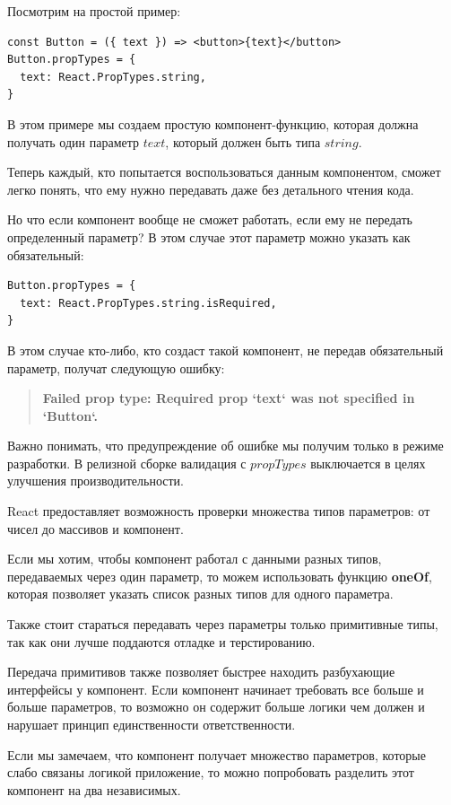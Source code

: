 Посмотрим на простой пример:

\begin{lstlisting}
const Button = ({ text }) => <button>{text}</button>
Button.propTypes = {
  text: React.PropTypes.string,
}
\end{lstlisting}

В этом примере мы создаем простую компонент-функцию, которая должна получать один параметр $text$, который должен быть типа $string$.

Теперь каждый, кто попытается воспользоваться данным компонентом, сможет легко понять, что ему нужно передавать даже без детального чтения кода.

Но что если компонент вообще не сможет работать, если ему не передать определенный параметр? В этом случае этот параметр можно указать как обязательный:

\begin{lstlisting}
Button.propTypes = {
  text: React.PropTypes.string.isRequired,
}
\end{lstlisting}

В этом случае кто-либо, кто создаст такой компонент, не передав обязательный параметр, получат следующую ошибку:

\begin{quotation}
\textbf{Failed prop type: Required prop `text` was not specified in `Button`.}
\end{quotation}

Важно понимать, что предупреждение об ошибке мы получим только в режиме разработки. В релизной сборке валидация с $propTypes$ выключается в целях улучшения производительности.

React предоставляет возможность проверки множества типов параметров: от чисел до массивов и компонент.

Если мы хотим, чтобы компонент работал с данными разных типов, передаваемых через один параметр, то можем использовать функцию \textbf{oneOf}, которая позволяет указать список разных типов для одного параметра.

Также стоит стараться передавать через параметры только примитивные типы, так как они лучше поддаются отладке и терстированию.

Передача примитивов также позволяет быстрее находить разбухающие интерфейсы у компонент. Если компонент начинает требовать все больше и больше параметров, то возможно он содержит больше логики чем должен и нарушает принцип единственности ответственности.

Если мы замечаем, что компонент получает множество параметров, которые слабо связаны логикой приложение, то можно попробовать разделить этот компонент на два независимых.

